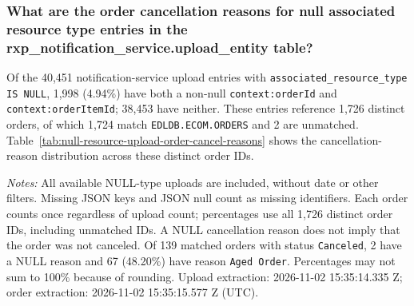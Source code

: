 \subsubsection{What are the order cancellation reasons for null associated resource type entries in the rxp\_notification\_service.\texorpdfstring{\allowbreak}{}upload\_entity table?}
\label{subsec:null-resource-upload-order-cancellation-reasons}
\noindent Of the 40,451 notification-service upload entries with \texttt{associated\_resource\_type IS NULL}, 1,998 (4.94\%) have both a non-null \texttt{context:orderId} and \texttt{context:orderItemId}; 38,453 have neither. These entries reference 1,726 distinct orders, of which 1,724 match \texttt{EDLDB.ECOM.ORDERS} and 2 are unmatched. Table~\ref{tab:null-resource-upload-order-cancel-reasons} shows the cancellation-reason distribution across these distinct order IDs.


\noindent\textit{Notes:} All available NULL-type uploads are included, without date or other filters. Missing JSON keys and JSON null count as missing identifiers. Each order counts once regardless of upload count; percentages use all 1,726 distinct order IDs, including unmatched IDs. A NULL cancellation reason does not imply that the order was not canceled. Of 139 matched orders with status \texttt{Canceled}, 2 have a NULL reason and 67 (48.20\%) have reason \texttt{Aged Order}. Percentages may not sum to 100\% because of rounding. Upload extraction: 2026-11-02 15:35:14.335 Z; order extraction: 2026-11-02 15:35:15.577 Z (UTC).


\clearpage

